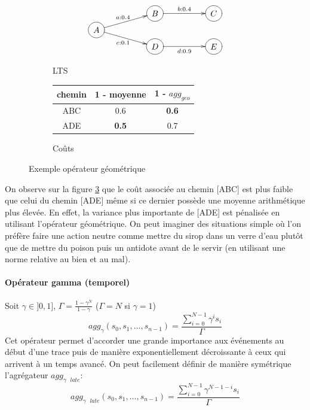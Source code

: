 \documentclass[11pt]{extarticle}
\begin{document}
\begin{figure}[h!]
    \centering
    \begin{subfigure}[b]{0.45\textwidth}
        \centering
        \[
        \xymatrix @R=0.1em@C=5em {
         & *++[o][F-]{B} \ar[r]^{b:0.4} & *++[o][F-]{C} \\
          *++[o][F-]{A} \ar[ru]^{a:0.4} \ar[rd]_{c:0.1} \\
        & *++[o][F-]{D} \ar[r]_{d:0.9} & *++[o][F-]{E}
        }
        \]
        \caption{LTS}
        \label{fig:lts_geo}
    \end{subfigure}
    \hfill
    \begin{subfigure}[b]{0.45\textwidth}
        \centering
        \begin{tabular}{ccc}
            chemin & 1 - moyenne & 1 - $agg_{geo}$ \\
            \hline
            ABC & 0.6 & \textbf{0.6} \\
            ADE & \textbf{0.5 }& 0.7 \\
        \end{tabular}
        \caption{Coûts}
        \label{fig:Coûts}
    \end{subfigure}
    \caption{Exemple opérateur géométrique}
    \label{fig:geo}
\end{figure}
On observe sur la figure \ref{fig:geo} que le coût associée au chemin [ABC] est plus faible que celui du chemin [ADE] même si ce dernier possède une moyenne arithmétique plus élevée. En effet, la variance plus importante de [ADE] est pénalisée en utilisant l'opérateur géométrique. On peut imaginer des situations simple où l'on préfère faire une action neutre comme mettre du sirop dans un verre d'eau plutôt que de mettre du poison puis un antidote avant de le servir (en utilisant une norme relative au bien et au mal).
    
\paragraph{Opérateur gamma (temporel)}
Soit $\gamma\in ]0,1]$, $\Gamma = \frac{1-\gamma^{N}}{1-\gamma}$ ($\Gamma =N $ si $\gamma=1$)
    \begin{equation}
        agg_{\gamma}(s_0,s_1,\dots,s_{n-1}) = \frac{ \sum_{i=0}^{N-1}\gamma^is_i}{\Gamma}
    \end{equation}
    Cet opérateur permet d'accorder une grande importance aux événements au début d'une trace puis de manière exponentiellement décroissante à ceux qui arrivent à un temps avancé. On peut facilement définir de manière symétrique l'agrégateur $agg_{\gamma \text{ }late}$:
    \begin{equation}
        agg_{\gamma \text{ }late}(s_0,s_1,\dots,s_{n-1}) = \frac{ \sum_{i=0}^{N-1}\gamma^{N-1-i}s_i}{\Gamma}        
    \end{equation}
    
\end{document}
